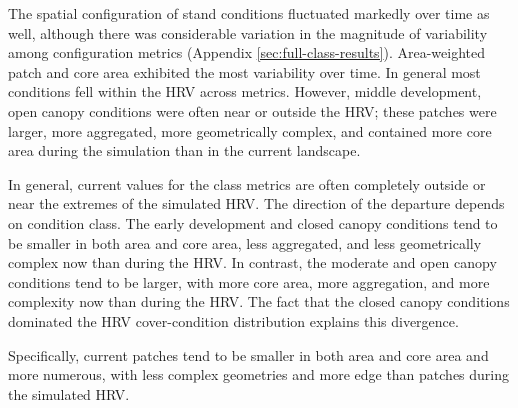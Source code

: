 The spatial configuration of stand conditions fluctuated markedly over time as well, although there was considerable variation in the magnitude of variability among configuration metrics (Appendix \ref{sec:full-class-results}). Area-weighted patch and core area exhibited the most variability over time. In general most conditions fell within the HRV across metrics. However, middle development, open canopy conditions were often near or outside the HRV; these patches were larger, more aggregated, more geometrically complex, and contained more core area during the simulation than in the current landscape.


In general, current values for the class metrics are often completely outside or near the extremes of the simulated HRV. The direction of the departure depends on condition class. The early development and closed canopy conditions tend to be smaller in both area and core area, less aggregated, and less geometrically complex now than during the HRV. In contrast, the moderate and open canopy conditions tend to be larger, with more core area, more aggregation, and more complexity now than during the HRV. The fact that the closed canopy conditions dominated the HRV cover-condition distribution explains this divergence.

Specifically, current patches tend to be smaller in both area and core area and more numerous, with less complex geometries and more edge than patches during the simulated HRV.

